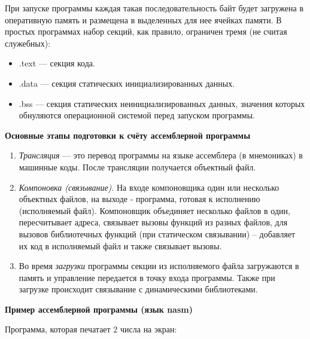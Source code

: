 При запуске программы каждая такая последовательность байт будет загружена в оперативную память и размещена в выделенных для нее ячейках памяти. 
В простых программах набор секций, как правило, ограничен тремя (не считая служебных): 
 \begin{itemize}
     \item .text --- секция кода.
     \item .data --- секция статических инициализированных данных.
     \item .bss --- секция статических неинициализированных данных, значения которых обнуляются операционной системой перед запуском программы.
 \end{itemize}
 
\textbf{Основные этапы подготовки к счёту ассемблерной программы}

\begin{enumerate}
    \item \textit{Трансляция} --- это перевод программы на языке ассемблера (в мнемониках) в машинные коды. После трансляции получается объектный файл.
    \item \textit{Компоновка (связывание)}. На входе компоновщика один или несколько объектных файлов, на выходе - программа, готовая к исполнению (исполняемый файл). Компоновщик объединяет несколько файлов в один, пересчитывает адреса, связывает вызовы функций из разных файлов, для вызовов библиотечных функций (при статическом связывании) -- добавляет их код в исполняемый файл и также связывает вызовы.
    \item Во время \textit{загрузки} программы секции из исполняемого файла загружаются в память и управление передается в точку входа программы. Также при загрузке происходит связывание с динамическими библиотеками.
\end{enumerate}

\textbf{Пример ассемблерной программы (язык nasm)}

Программа, которая печатает 2 числа на экран:

